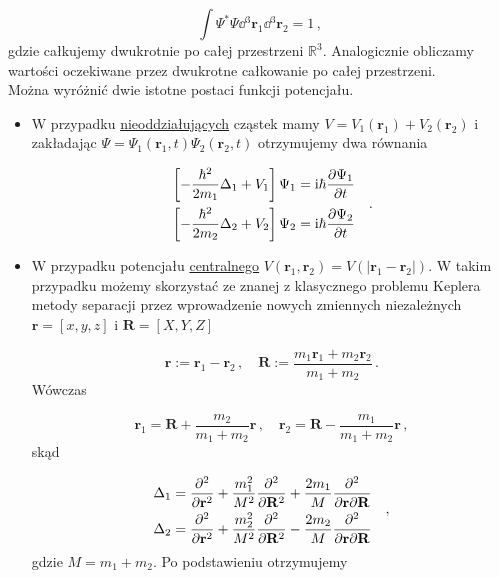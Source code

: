 \documentclass{myclass}
\begin{document}
\begin{equation*}
\int\Psi^*\Psi\dd{^3\mathbf{r}_1}\dd{^3\mathbf{r}_2}=1\,,
\end{equation*}
gdzie całkujemy dwukrotnie po całej przestrzeni \(\mathbb{R}^3\). Analogicznie obliczamy wartości
oczekiwane przez dwukrotne całkowanie po całej przestrzeni.\\

Można wyróżnić dwie istotne postaci funkcji potencjału.

\begin{itemize}

\item W przypadku \underline{nieoddziałujących} cząstek mamy
\(V=V_1(\mathbf{r}_1)+V_2(\mathbf{r}_2)\) i zakładając
\(\Psi=\Psi_1(\mathbf{r}_1,t)\Psi_2(\mathbf{r}_2,t)\) otrzymujemy dwa równania

\begin{equation*}
    \begin{split}
        &\left[-\frac{\hbar^2}{2m_1}\Delta_1+V_1\right]\Psi_1=\mathrm{i}\hbar\pdv{\Psi_1}{t}\\
        &\left[-\frac{\hbar^2}{2m_2}\Delta_2+V_2\right]\Psi_2=\mathrm{i}\hbar\pdv{\Psi_2}{t}
    \end{split}\quad.
\end{equation*}

\item W przypadku potencjału \underline{centralnego}
\(V(\mathbf{r}_1,\mathbf{r}_2)=V(|\mathbf{r}_1-\mathbf{r}_2|)\). W takim przypadku możemy skorzystać
ze znanej z klasycznego problemu Keplera metody separacji przez wprowadzenie nowych zmiennych
niezależnych \(\mathbf{r}=[x,y,z]\) i \(\mathbf{R}=[X,Y,Z]\)

\begin{equation*}
    \mathbf{r}:=\mathbf{r}_1-\mathbf{r}_2\,,\quad \mathbf{R}:=\frac{m_1\mathbf{r}_1+m_2\mathbf{r}_2}{m_1+m_2}\,.
\end{equation*}
Wówczas

\begin{equation*}
    \mathbf{r}_1=\mathbf{R}+\frac{m_2}{m_1+m_2}\mathbf{r}\,,\quad \mathbf{r}_2=\mathbf{R}-\frac{m_1}{m_1+m_2}\mathbf{r}\,,
\end{equation*}
skąd

\begin{equation*}
\begin{split}
    &\Delta_1=\pdv[2]{ }{\mathbf{r}}+\frac{m_1^2}{M^2}\pdv[2]{ }{\mathbf{R}}+\frac{2m_1}{M}\frac{\partial^2}{\partial \mathbf{r}\partial \mathbf{R}}\\
    &\Delta_2=\pdv[2]{ }{\mathbf{r}}+\frac{m_2^2}{M^2}\pdv[2]{ }{\mathbf{R}}-\frac{2m_2}{M}\frac{\partial^2}{\partial\mathbf{r}\partial \mathbf{R}}
\end{split}\quad,
\end{equation*}
gdzie \(M=m_1+m_2\). Po podstawieniu otrzymujemy


\end{itemize}
\end{document}
